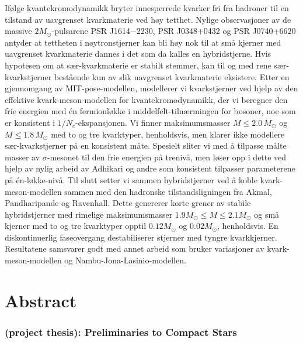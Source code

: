 Ifølge kvantekromodynamikk bryter innesperrede kvarker fri fra hadroner til en tilstand av uavgrenset kvarkmaterie ved høy tetthet.
Nylige observasjoner av de massive $2 M_\odot$-pulsarene PSR J1614$-$2230, PSR J0348$+$0432 og PSR J0740$+$6620
antyder at tettheten i nøytronstjerner kan bli høy nok til at små kjerner med uavgrenset kvarkmaterie
dannes i det som da kalles en hybridstjerne.
Hvis hypotesen om at sær-kvarkmaterie er stabilt stemmer,
kan til og med rene sær-kvarkstjerner bestående kun av slik uavgrenset kvarkmaterie eksistere.
Etter en gjennomgang av MIT-pose-modellen,
modellerer vi kvarkstjerner ved hjelp av den effektive kvark-meson-modellen for kvantekromodynamikk,
der vi beregner den frie energien med én fermionløkke i middelfelt-tilnærmingen for bosoner, %
noe som er konsistent i $1/N_c$-ekspansjonen.
Vi finner maksimumsmasser $M \leq 2.0 \, M_\odot$ og $M \leq 1.8 \, M_\odot$ med
to og tre kvarktyper, henholdsvis,
men klarer ikke modellere sær-kvarkstjerner på en konsistent måte.
Spesielt sliter vi med å tilpasse målte masser av $\sigma$-mesonet til den frie energien på trenivå,
men løser opp i dette ved hjelp av nylig arbeid av Adhikari og andre
som konsistent tilpasser parameterene på én-løkke-nivå.
Til slutt setter vi sammen hybridstjerner ved å koble kvark-meson-modellen
sammen med den hadronske tilstandsligningen fra Akmal, Pandharipande og Ravenhall.
Dette genererer korte grener av stabile hybridstjerner med rimelige maksimumsmasser $1.9 M_\odot \leq M \leq 2.1 M_\odot$
og små kjerner med to og tre kvarktyper opptil $0.12 M_\odot$ og $0.02 M_\odot$, henholdsvis.
En diskontinuerlig faseovergang destabiliserer stjerner med tyngre kvarkkjerner.
Resultatene samsvarer godt med annet arbeid
som bruker variasjoner av kvark-meson-modellen
og Nambu-Jona-Lasinio-modellen.%
\tikzexternaldisable%
%
\tikzexternalenable%

\chapter{Abstract}

\subsection*{ (project thesis): Preliminaries to Compact Stars}

